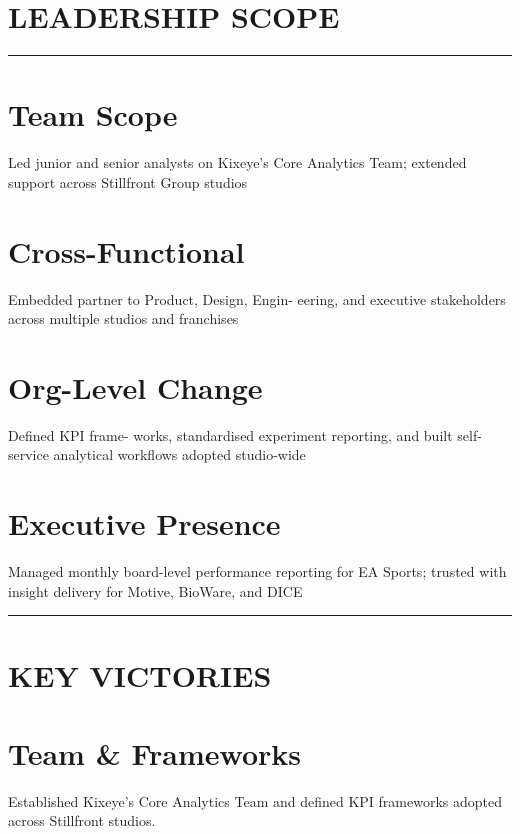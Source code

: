 %
%

\section{LEADERSHIP SCOPE}
\vspace{-0.1cm}%
\noindent\rule{\textwidth}{0.4pt}
\vspace{-0.1cm}%
%
\section{\large Team Scope}
Led junior and senior analysts on Kixeye's Core Analytics Team; extended support across Stillfront Group studios
~
\section{\large Cross-Functional}
Embedded partner to Product, Design, Engin- eering, and executive stakeholders across multiple studios and franchises
~
\section{\large Org-Level Change}
Defined KPI frame- works, standardised experiment reporting, and built self-service analytical workflows adopted studio-wide
~
\section{\large Executive Presence}
Managed monthly board-level performance reporting for EA Sports; trusted with insight delivery for Motive, BioWare, and DICE
%
\noindent\rule{\textwidth}{0.4pt}%
\vspace{-0.1cm}%
%
\section{KEY VICTORIES}
\vspace{-0.25cm}
%
\section{\large \faGem Team \& Frameworks}
Established Kixeye's Core Analytics Team and defined KPI frameworks adopted across Stillfront studios.
%
